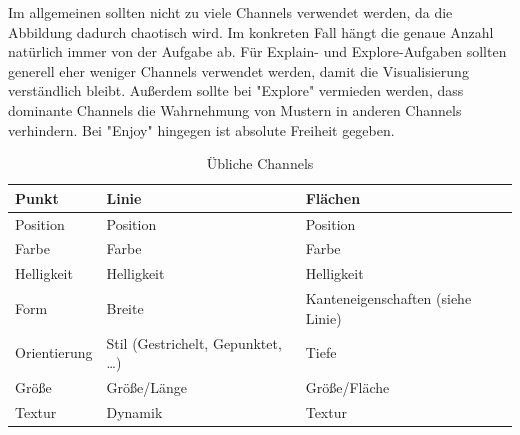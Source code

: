 				Im allgemeinen sollten nicht zu viele Channels verwendet werden, da die Abbildung dadurch chaotisch wird. Im konkreten Fall hängt die genaue Anzahl natürlich immer von der Aufgabe ab. Für Explain- und Explore-Aufgaben sollten generell eher weniger Channels verwendet werden, damit die Visualisierung verständlich bleibt. Außerdem sollte bei "Explore" vermieden werden, dass dominante Channels die Wahrnehmung von Mustern in anderen Channels verhindern. Bei "Enjoy" hingegen ist absolute Freiheit gegeben.

				\begin{table}
					\centering
					\begin{tabular}{l|l|l}
						\toprule
						\textbf{Punkt} & \textbf{Linie}                       & \textbf{Flächen}                  \\ \midrule
						Position       & Position                             & Position                          \\
						Farbe          & Farbe                                & Farbe                             \\
						Helligkeit     & Helligkeit                           & Helligkeit                        \\
						Form           & Breite                               & Kanteneigenschaften (siehe Linie) \\
						Orientierung   & Stil (Gestrichelt, Gepunktet, \dots) & Tiefe                             \\
						Größe          & Größe/Länge                          & Größe/Fläche                      \\
						Textur         & Dynamik                              & Textur                            \\ \bottomrule
					\end{tabular}
					\caption{Übliche Channels}
					\label{fig:channels}
				\end{table}

